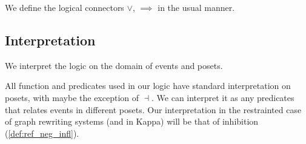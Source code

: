 We define the logical connectors $\vee$, $\implies$ in the usual manner.

\subsection{Interpretation}

We interpret the logic on the domain of events and posets.

All function and predicates used in our logic have standard interpretation on posets, with maybe the exception of $\dashv$. We can interpret it as any predicates that relates events in different posets. Our interpretation in the restrainted case of graph rewriting systems (and in Kappa) will be that of inhibition (\autoref{def:ref_neg_infl}).

